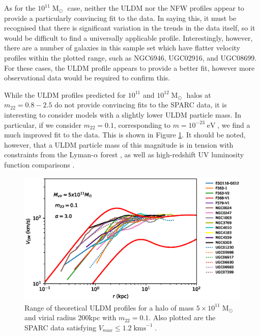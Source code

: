 \documentclass[a4paper,11pt]{article}
\begin{document}
As for the $10^{11}\operatorname{M}_{\odot}$ case, neither the ULDM nor the NFW profiles appear to provide a particularly convincing fit to the data. In saying this, it must be recognised that there is significant variation in the trends in the data itself, so it would be difficult to find a universally applicable profile. Interestingly, however, there are a number of galaxies in this sample set which have flatter velocity profiles within the plotted range, such as NGC6946, UGC02916, and UGC08699. For these cases, the ULDM profile appears to provide a better fit, however more observational data would be required to confirm this. 

While the ULDM profiles predicted for $10^{11}$ and $10^{12} \operatorname{M}_{\odot}$ halos at $m_{22} = 0.8 - 2.5$ do not provide convincing fits to  the SPARC data, it is interesting to consider models with a slightly lower ULDM particle mass. In particular, if we consider $m_{22} = 0.1$, corresponding to $m = 10^{-23} \operatorname{eV}$, we find a much improved fit to the data. This is shown in Figure \ref{fig:velocity_23}. It should be noted, however, that a ULDM particle mass of this magnitude is in tension with constraints from the Lyman-$\alpha$ forest \cite{Amendola:2005ad}, as well as high-redshift UV luminosity function comparisons \cite{Bozek:2014uqa}. 


\begin{figure}
\centering
\includegraphics[scale = 0.7, trim={0cm 2.5cm 1cm 0.35cm}]{pics/best_match.eps} 
\caption{Range of theoretical ULDM profiles for a halo of mass $5\times 10^{11}\operatorname{M}_{\odot}$ and virial radius 200kpc with $m_{22} = 0.1$. Also plotted are the SPARC data satisfying $V_{max}\leq 1.2 \operatorname{kms}^{-1}$.}\label{fig:velocity_23}
\end{figure}
\end{document}
